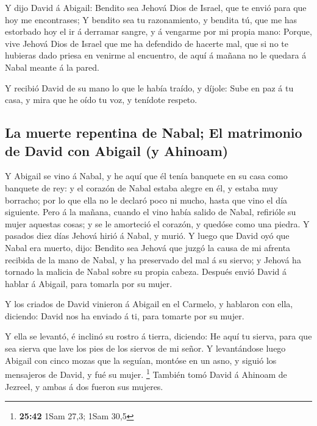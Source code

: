  Y dijo David á Abigail: Bendito sea Jehová Dios de
Israel, que te envió para que hoy me encontrases;  Y
bendito sea tu razonamiento, y bendita tú, que me has estorbado hoy el
ir á derramar sangre, y á vengarme por mi propia mano: 
Porque, vive Jehová Dios de Israel que me ha defendido de hacerte mal,
que si no te hubieras dado priesa en venirme al encuentro, de aquí á
mañana no le quedara á Nabal meante á la pared.

 Y recibió David de su mano lo que le había traído, y
díjole: Sube en paz á tu casa, y mira que he oído tu voz, y tenídote
respeto.

\hypertarget{la-muerte-repentina-de-nabal-el-matrimonio-de-david-con-abigail-y-ahinoam}{%
\subsection{La muerte repentina de Nabal; El matrimonio de David con
Abigail (y
Ahinoam)}\label{la-muerte-repentina-de-nabal-el-matrimonio-de-david-con-abigail-y-ahinoam}}

 Y Abigail se vino á Nabal, y he aquí que él tenía
banquete en su casa como banquete de rey: y el corazón de Nabal estaba
alegre en él, y estaba muy borracho; por lo que ella no le declaró poco
ni mucho, hasta que vino el día siguiente.  Pero á la
mañana, cuando el vino había salido de Nabal, refirióle su mujer
aquestas cosas; y se le amorteció el corazón, y quedóse como una piedra.
 Y pasados diez días Jehová hirió á Nabal, y murió.
 Y luego que David oyó que Nabal era muerto, dijo:
Bendito sea Jehová que juzgó la causa de mi afrenta recibida de la mano
de Nabal, y ha preservado del mal á su siervo; y Jehová ha tornado la
malicia de Nabal sobre su propia cabeza. Después envió David á hablar á
Abigail, para tomarla por su mujer.

 Y los criados de David vinieron á Abigail en el Carmelo,
y hablaron con ella, diciendo: David nos ha enviado á ti, para tomarte
por su mujer.

 Y ella se levantó, é inclinó su rostro á tierra,
diciendo: He aquí tu sierva, para que sea sierva que lave los pies de
los siervos de mi señor.  Y levantándose luego Abigail
con cinco mozas que la seguían, montóse en un asno, y siguió los
mensajeros de David, y fué su mujer. \footnote{\textbf{25:42} 1Sam 27,3;
  1Sam 30,5}  También tomó David á Ahinoam de Jezreel, y
ambas á dos fueron sus mujeres.

